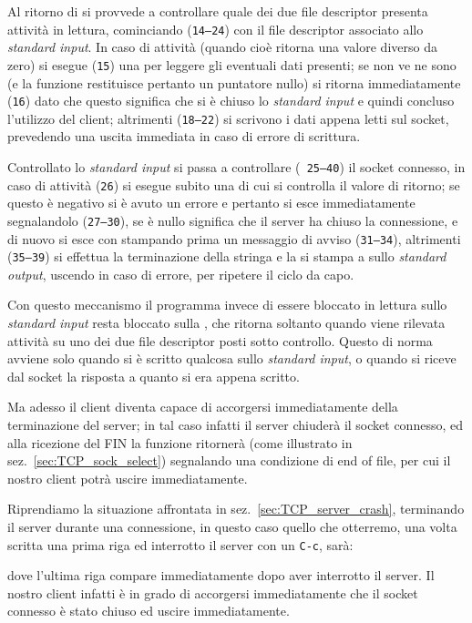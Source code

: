Al ritorno di  si provvede a controllare quale dei due file
descriptor presenta attività in lettura, cominciando (\texttt{\small 14--24})
con il file descriptor associato allo \textit{standard input}. In caso di
attività (quando cioè  ritorna una valore diverso da zero) si
esegue (\texttt{\small 15}) una  per leggere gli eventuali dati
presenti; se non ve ne sono (e la funzione restituisce pertanto un puntatore
nullo) si ritorna immediatamente (\texttt{\small 16}) dato che questo
significa che si è chiuso lo \textit{standard input} e quindi concluso l'utilizzo del
client; altrimenti (\texttt{\small 18--22}) si scrivono i dati appena letti
sul socket, prevedendo una uscita immediata in caso di errore di scrittura.

Controllato lo \textit{standard input} si passa a controllare (\texttt{\small
  25--40}) il socket connesso, in caso di attività (\texttt{\small 26}) si
esegue subito una  di cui si controlla il valore di ritorno; se
questo è negativo si è avuto un errore e pertanto si esce immediatamente
segnalandolo (\texttt{\small 27--30}), se è nullo significa che il server ha
chiuso la connessione, e di nuovo si esce con stampando prima un messaggio di
avviso (\texttt{\small 31--34}), altrimenti (\texttt{\small 35--39}) si
effettua la terminazione della stringa e la si stampa a sullo \textit{standard
  output}, uscendo in caso di errore, per ripetere il ciclo da capo.

Con questo meccanismo il programma invece di essere bloccato in lettura sullo
\textit{standard input} resta bloccato sulla , che ritorna
soltanto quando viene rilevata attività su uno dei due file descriptor posti
sotto controllo.  Questo di norma avviene solo quando si è scritto qualcosa
sullo \textit{standard input}, o quando si riceve dal socket la risposta a quanto si
era appena scritto. 

Ma adesso il client diventa capace di accorgersi immediatamente della
terminazione del server; in tal caso infatti il server chiuderà il socket
connesso, ed alla ricezione del FIN la funzione  ritornerà (come
illustrato in sez.~\ref{sec:TCP_sock_select}) segnalando una condizione di end
of file, per cui il nostro client potrà uscire immediatamente.

Riprendiamo la situazione affrontata in sez.~\ref{sec:TCP_server_crash},
terminando il server durante una connessione, in questo caso quello che
otterremo, una volta scritta una prima riga ed interrotto il server con un
\texttt{C-c}, sarà:
dove l'ultima riga compare immediatamente dopo aver interrotto il server. Il
nostro client infatti è in grado di accorgersi immediatamente che il socket
connesso è stato chiuso ed uscire immediatamente.

